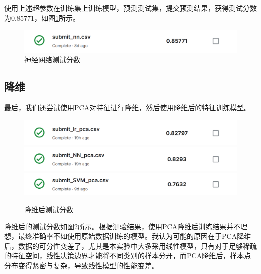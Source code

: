 \documentclass{article}
\begin{document}
使用上述超参数在训练集上训练模型，预测测试集，提交预测结果，获得测试分数为0.85771，如图\ref{fig:submit-nn}所示。

\begin{figure}[htbp]
    \centering
    \includegraphics[width=0.8\linewidth]{figure/fig-submit-nn.png}
    \caption{神经网络测试分数}
    \label{fig:submit-nn}
\end{figure}

\subsection{降维}

最后，我们还尝试使用PCA对特征进行降维，然后使用降维后的特征训练模型。

\begin{figure}[htbp]
    \centering
    \includegraphics[width=0.8\linewidth]{figure/fig-submit-lr-pca.png}
    \includegraphics[width=0.8\linewidth]{figure/fig-submit-nn-pca.png}
    \includegraphics[width=0.8\linewidth]{figure/fig-submit-svm-pca.png}
    \caption{降维后测试分数}
    \label{fig:submit-pca}
\end{figure}

降维后的测试分数如图\ref{fig:submit-pca}所示。根据测验结果，使用PCA降维后训练结果并不理想，最终准确率不如使用原始数据训练的模型。我认为可能的原因在于PCA降维后，数据的可分性变差了，尤其是本实验中大多采用线性模型，只有对于足够稀疏的特征空间，线性决策边界才能将不同类别的样本分开，而PCA降维后，样本点分布变得紧密与复杂，导致线性模型的性能变差。
\end{document}

